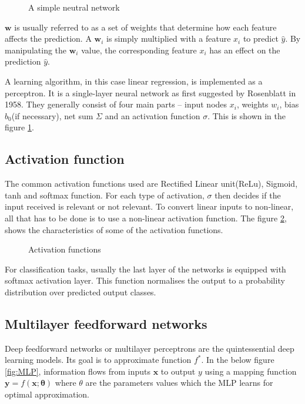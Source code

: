 \begin{figure}
    \centering
        \def\svgwidth{0.55\textwidth}
        
        \caption{A simple neutral network}
        \label{fig:simpleNN}
\end{figure}


$\mathbf{w}$ is usually referred to as a set of weights that determine how each feature
affects the prediction. A $\mathbf{w}_i$ is simply multiplied with a feature $x_i$ to
predict $\hat y$. By manipulating the $\mathbf{w}_i$ value, the corresponding feature $x_i$ has
an effect on the prediction  $\hat y$.

A learning algorithm, in this case linear regression, is implemented as a perceptron. It
is a single-layer neural network as first suggested by Rosenblatt in 1958. They generally consist of four main parts -- input
nodes $x_i$, weights $w_i$, bias $b_0$(if necessary), net sum $\Sigma$ and an activation
function $\sigma$. This is shown in the figure \ref{fig:simpleNN}.

\subsection{Activation function}
\label{subsec:activationfunction}
The common activation functions used are Rectified Linear unit(ReLu), Sigmoid, tanh and
softmax function. For each type of activation, $\sigma$ then decides if the input received is
relevant or not relevant. To convert linear inputs to non-linear, all that has to be done
is to use a non-linear activation function. The figure \ref{fig:activationfunctions},
shows the characteristics of some of the activation functions.

\begin{figure}[h]
	\begin{center}
   \def\svgwidth{1.1\textwidth}
	\end{center}
    \caption{Activation functions}
    \label{fig:activationfunctions}
\end{figure}

For classification tasks, usually the last layer of the networks is equipped with softmax
activation layer. This function normalises the output to a probability distribution over
predicted output classes.

\subsection{Multilayer feedforward networks}
\label{subsec:MLP}
Deep feedforward networks or multilayer perceptrons are the quintessential deep learning
models. Its goal is to approximate function $f^*$. In the below figure \ref{fig:MLP},
information flows from inputs $\mathbf{x}$ to output $y$ using a mapping function
$\mathbf{y} = f(\mathbf{x};\mathbf{\theta})$ where $\theta$ are the parameters values
which the MLP learns for optimal approximation.

